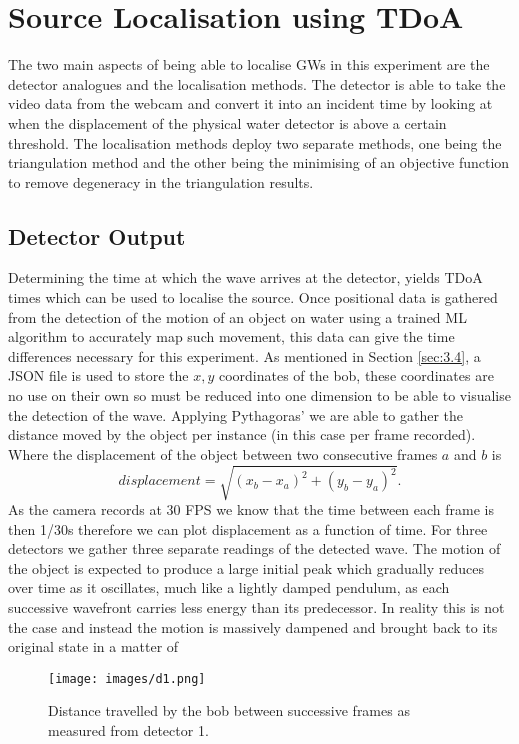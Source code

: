 \section{Source Localisation using TDoA}

The two main aspects of being able to localise GWs in this experiment are the detector analogues and the localisation methods. The detector is able to take the video data from the webcam and convert it into an incident time by looking at when the displacement of the physical water detector is above a certain threshold. The localisation methods deploy two separate methods, one being the triangulation method and the other being the minimising of an objective function to remove degeneracy in the triangulation results.

\subsection{Detector Output}
\label{sec:4.1.1}
Determining the time at which the wave arrives at the detector, yields TDoA times which can be used to localise the source. Once positional data is gathered from the detection of the motion of an object on water using a trained ML algorithm to accurately map such movement, this data can give the time differences necessary for this experiment. As mentioned in Section \ref{sec:3.4}, a JSON file is used to store the $x,y$ coordinates of the bob, these coordinates are no use on their own so must be reduced into one dimension to be able to visualise the detection of the wave. Applying Pythagoras' we are able to gather the distance moved by the object per instance (in this case per frame recorded). Where the displacement of the object between two consecutive frames $a$ and $b$ is 
\begin{equation}
    displacement = \sqrt{(x_b-x_a)^2+(y_b-y_a)^2}.
\end{equation}
 As the camera records at 30 FPS we know that the time between each frame is then 1/30s therefore we can plot displacement as a function of time. For three detectors we gather three separate readings of the detected wave. The motion of the object is expected to produce a large initial peak which gradually reduces over time as it oscillates, much like a lightly damped pendulum, as each successive wavefront carries less energy than its predecessor. In reality this is not the case and instead the motion is massively dampened and brought back to its original state in a matter of 
\begin{figure}[h!]
    \centering
    \texttt{[image: images/d1.png]}
    \caption{Distance travelled by the bob between successive frames as measured from detector 1.}
    \label{fig:d1}
\end{figure}

